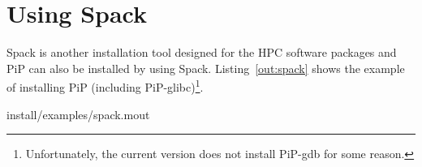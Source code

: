 
\section{Using Spack}

Spack is another installation tool
designed for the HPC software packages and PiP can also be installed
by using Spack. Listing~\ref{out:spack} shows the example of
installing PiP (including PiP-glibc)\footnote{Unfortunately, the
current version does not install PiP-gdb for some reason.}.


                {install/examples/spack.mout}

